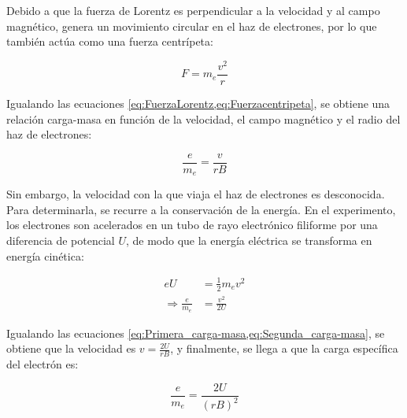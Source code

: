Debido a que la fuerza de Lorentz es perpendicular a la velocidad y al campo magnético, genera un movimiento circular en el haz de electrones, por lo que también actúa como una fuerza centrípeta:

\begin{equation}
  F = m_{e} \frac{v^{2}}{r}
  \label{eq:Fuerzacentripeta}
\end{equation}

Igualando las ecuaciones \cref{eq:FuerzaLorentz,eq:Fuerzacentripeta}, se obtiene una relación carga-masa en función de la velocidad, el campo magnético y el radio del haz de electrones:

\begin{equation}
  \frac{e}{m_{e}} = \frac{v}{r B}
  \label{eq:Primera_carga-masa}
\end{equation}

Sin embargo, la velocidad con la que viaja el haz de electrones es desconocida. Para determinarla, se recurre a la conservación de la energía. En el experimento, los electrones son acelerados en un tubo de rayo electrónico filiforme por una diferencia de potencial \( U \), de modo que la energía eléctrica se transforma en energía cinética:

\begin{equation}
  \begin{aligned}
    e U &= \frac{1}{2} m_{e} v^{2} \\
    \Rightarrow \frac{e}{m_{e}} &= \frac{v^{2}}{2 U}
  \end{aligned}
  \label{eq:Segunda_carga-masa}
\end{equation}

Igualando las ecuaciones \cref{eq:Primera_carga-masa,eq:Segunda_carga-masa}, se obtiene que la velocidad es \( v = \frac{2 U}{r B} \), y finalmente, se llega a que la carga específica del electrón es: \cite{leybold_experimentos}

\begin{equation}
  \frac{e}{m_{e}} = \frac{2 U}{(r B)^{2}}
  \label{eq:carga-masa}
\end{equation}
